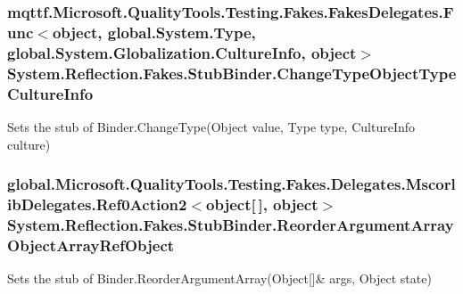 \hypertarget{class_system_1_1_reflection_1_1_fakes_1_1_stub_binder_aea13181476a6070e747edcc80089f2a5}{
\subsubsection[{Change\-Type\-Object\-Type\-Culture\-Info}]{\setlength{\rightskip}{0pt plus 5cm}mqttf.\-Microsoft.\-Quality\-Tools.\-Testing.\-Fakes.\-Fakes\-Delegates.\-Func$<$object, global.\-System.\-Type, global.\-System.\-Globalization.\-Culture\-Info, object$>$ System.\-Reflection.\-Fakes.\-Stub\-Binder.\-Change\-Type\-Object\-Type\-Culture\-Info}}\label{class_system_1_1_reflection_1_1_fakes_1_1_stub_binder_aea13181476a6070e747edcc80089f2a5}


Sets the stub of Binder.\-Change\-Type(\-Object value, Type type, Culture\-Info culture)

\hypertarget{class_system_1_1_reflection_1_1_fakes_1_1_stub_binder_a8401d4a02cbbd631a6b8f9ac00b81215}{
\subsubsection[{Reorder\-Argument\-Array\-Object\-Array\-Ref\-Object}]{\setlength{\rightskip}{0pt plus 5cm}global.\-Microsoft.\-Quality\-Tools.\-Testing.\-Fakes.\-Delegates.\-Mscorlib\-Delegates.\-Ref0\-Action2$<$object\mbox{[}$\,$\mbox{]}, object$>$ System.\-Reflection.\-Fakes.\-Stub\-Binder.\-Reorder\-Argument\-Array\-Object\-Array\-Ref\-Object}}\label{class_system_1_1_reflection_1_1_fakes_1_1_stub_binder_a8401d4a02cbbd631a6b8f9ac00b81215}


Sets the stub of Binder.\-Reorder\-Argument\-Array(Object\mbox{[}\mbox{]}\& args, Object state)


